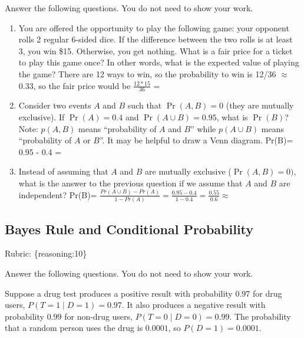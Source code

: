\documentclass{article}
\def\rubric#1{\gre{Rubric: \{#1\}}}{}
\def\blu#1{{\color{blu}#1}}
\def\gre#1{{\color{gre}#1}}
\def\ans#1{{\color{ans}#1}}
\begin{document}
\blu{Answer the following questions.} You do not need to show your work.


\begin{enumerate}
\item You are offered the opportunity to play the following game: your opponent rolls 2 regular 6-sided dice. If the difference between the two rolls is at least 3, you win \$15. Otherwise, you get nothing. What is a fair price for a ticket to play this game once? In other words, what is the expected value of playing the game?
\ans{There are 12 ways to win, so the probability to win is 12/36 $\approx$ 0.33, so the fair price would be $\frac{12 * 15}{36}$ = \fbox{5}}
\item Consider two events $A$ and $B$ such that $\Pr(A, B)=0$ (they are mutually exclusive). If $\Pr(A) = 0.4$ and $\Pr(A \cup B) = 0.95$, what is $\Pr(B)$? Note: $p(A, B)$ means
``probability of $A$ and $B$'' while $p(A \cup B)$ means ``probability of $A$ or $B$''. It may be helpful to draw a Venn diagram.
\ans{Pr(B)= 0.95 - 0.4 = }
\item Instead of assuming that $A$ and $B$ are mutually exclusive ($\Pr(A,B) = 0)$, what is the answer to the previous question if we assume that $A$ and $B$ are independent?
\ans{Pr(B)= $\frac{Pr(A \cup B) - Pr(A)}{1 - Pr(A)} = \frac{0.95 - 0.4}{1 - 0.4} = \frac{0.55}{0.6} \approx $\fbox{0.916}}

\end{enumerate}

\subsection{Bayes Rule and Conditional Probability}
\rubric{reasoning:10}

\blu{Answer the following questions.} You do not need to show your work.

Suppose a drug test produces a positive result with probability $0.97$ for drug users, $P(T=1 \mid D=1)=0.97$. It also produces a negative result with probability $0.99$ for non-drug users, $P(T=0 \mid D=0)=0.99$. The probability that a random person uses the drug is $0.0001$, so $P(D=1)=0.0001$.
\end{document}
